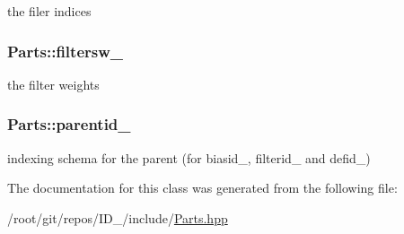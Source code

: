 the filer indices 

\hypertarget{classParts_a1de4d2cb595176d37aae609acbce88d8}{
\subsubsection[{filtersw\-\_\-}]{ {\bf \-Parts\-::filtersw\-\_\-}}}\label{classParts_a1de4d2cb595176d37aae609acbce88d8}


the filter weights 

\hypertarget{classParts_ad74222c286ee6ee93659109a6d1d625f}{
\subsubsection[{parentid\-\_\-}]{ {\bf \-Parts\-::parentid\-\_\-}}}\label{classParts_ad74222c286ee6ee93659109a6d1d625f}


indexing schema for the parent (for biasid\-\_\-, filterid\-\_\- and defid\-\_\-) 



\-The documentation for this class was generated from the following file\-:\begin{DoxyCompactItemize}
\item 
/root/git/repos/\-I\-D\-\_/include/\hyperlink{Parts_8hpp}{\-Parts.\-hpp}\end{DoxyCompactItemize}

